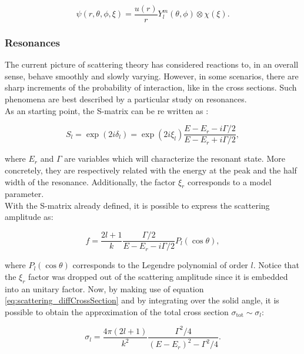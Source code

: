 \documentclass[openany]{book}
\begin{document}
\begin{equation} \label{eq:scattering_waveFunction}
	\psi(r, \theta, \phi, \xi) = \frac{u(r)}{r} Y_{l}^{m}(\theta, \phi) \otimes \chi(\xi).
\end{equation}

\subsubsection{Resonances} \label{ssub:scattering_resonances}

The current picture of scattering theory has considered reactions to, in an overall sense, behave smoothly and slowly varying. However, in some scenarios, there are sharp increments of the probability of interaction, like in the cross sections. Such phenomena are best described by a particular study on resonances. \\

As an starting point, the S-matrix can be re written as \cite{joachain_1975}: 

\begin{equation} \label{eq:scattering_resonant_Smatrix}
	S_l = \exp{(2i\delta_l)} = \exp(2i\xi_l) \frac{E - E_r - i\Gamma/2 }{E - E_r + i\Gamma/2 },
\end{equation}

where $E_r$ and $\Gamma$ are variables which will characterize the resonant state. More concretely, they are respectively related with the energy at the peak and the half width of the resonance. Additionally, the factor $\xi_r$ corresponds to a model parameter.  \\ 

With the S-matrix already defined, it is possible to express the scattering amplitude as: 

\begin{equation} \label{eq:scattering_resonant_scatteringAmplitude}
	f =  \frac{2l + 1}{k} \frac{\Gamma/2}{E - E_r - i\Gamma/2}P_l(\cos \theta),
\end{equation}

where $P_l(\cos \theta)$ corresponds to the Legendre polynomial of order $l$. Notice that the $\xi_r$ factor was dropped out of the scattering amplitude since it is embedded into an unitary factor.   Now, by making use of equation \ref{eq:scattering_diffCrossSection} and by integrating over the solid angle, it is possible to obtain the approximation of the total cross section $\sigma_{\mathrm{tot}} \sim \sigma_l$: 

\begin{equation} \label{eq:scattering_resonant_breitWigner}
	\sigma_l =  \frac{4\pi(2l + 1)}{k^2} \frac{\Gamma^2/4}{(E - E_r)^2 - \Gamma^2/4}.
\end{equation}
\end{document}
